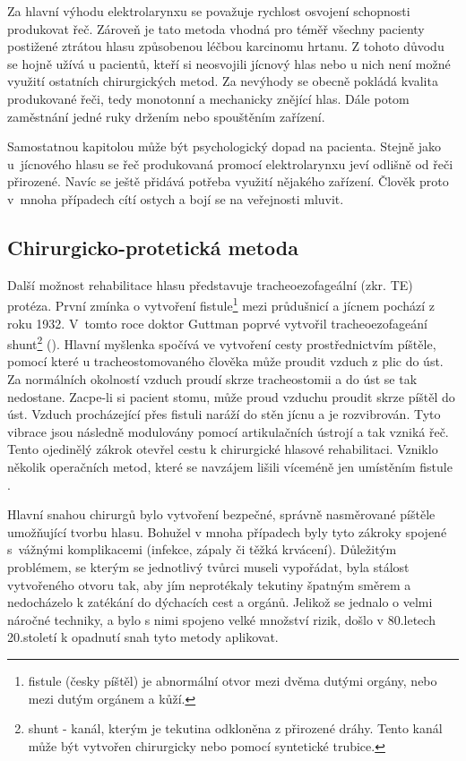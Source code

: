 Za hlavní výhodu elektrolarynxu se považuje rychlost osvojení schopnosti
produkovat řeč. Zároveň je tato metoda vhodná pro téměř všechny pacienty
postižené ztrátou hlasu způsobenou léčbou karcinomu hrtanu. Z tohoto důvodu se
hojně užívá u pacientů, kteří si neosvojili jícnový hlas nebo u nich není
možné využití ostatních chirurgických metod.
Za nevýhody se obecně pokládá kvalita produkované řeči, tedy monotonní a
mechanicky znějící hlas. Dále potom zaměstnání jedné ruky držením nebo
spouštěním zařízení.

Samostatnou kapitolou může být psychologický dopad na pacienta. Stejně jako
u~jícnového hlasu se řeč produkovaná promocí elektrolarynxu jeví odlišně od
řeči přirozené. Navíc se ještě přidává potřeba využití nějakého zařízení.
Člověk proto v~mnoha případech cítí ostych a bojí se na veřejnosti mluvit.



\subsection{Chirurgicko-protetická metoda} %
\label{sub:cause:treatment:tracheo}

Další možnost rehabilitace hlasu představuje tracheoezofageální (zkr. TE) protéza.
První zmínka o vytvoření fistule\footnote{fistule (česky píštěl) je abnormální
otvor mezi dvěma dutými orgány, nebo mezi dutým orgánem a kůží.} mezi
průdušnicí a jícnem pochází z roku 1932. V~tomto roce doktor Guttman poprvé
vytvořil tracheoezofageání shunt\footnote{shunt - kanál, kterým je tekutina
odkloněna z přirozené dráhy. Tento kanál může být vytvořen chirurgicky nebo
pomocí syntetické trubice.} (). Hlavní myšlenka spočívá ve
vytvoření cesty prostřednictvím píštěle, pomocí které u tracheostomovaného
člověka může proudit vzduch z plic do úst. Za normálních okolností vzduch
proudí skrze tracheostomii a do úst se tak nedostane. Zacpe-li si pacient
stomu, může proud vzduchu proudit skrze píštěl do úst. Vzduch procházející
přes fistuli naráží do stěn jícnu a je rozvibrován. Tyto vibrace jsou následně
modulovány pomocí artikulačních ústrojí a tak vzniká řeč.
Tento ojedinělý zákrok otevřel cestu k chirurgické hlasové rehabilitaci.
Vzniklo několik operačních metod, které se navzájem lišili víceméně jen
umístěním fistule \cite{Kramp2009}.

Hlavní snahou chirurgů bylo vytvoření bezpečné, správně nasměrované píštěle
umožňující tvorbu hlasu. Bohužel v mnoha případech byly tyto zákroky spojené
s~vážnými komplikacemi (infekce, zápaly či těžká krvácení). Důležitým
problémem, se kterým se jednotlivý tvůrci museli vypořádat, byla stálost
vytvořeného otvoru tak, aby jím neprotékaly tekutiny špatným směrem a
nedocházelo k zatékání do dýchacích cest a orgánů. Jelikož se jednalo o velmi
náročné techniky, a bylo s nimi spojeno velké množství rizik, došlo v
80.letech 20.století k opadnutí snah tyto metody aplikovat.

